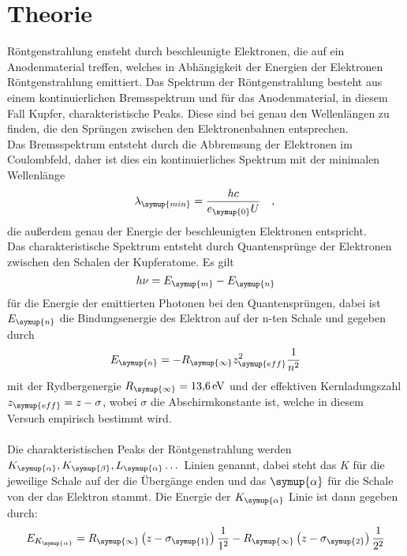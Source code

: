 \section{Theorie}
\label{sec:Theorie}
Röntgenstrahlung ensteht durch beschleunigte Elektronen, die auf ein Anodenmaterial
treffen, welches in Abhängigkeit der Energien der Elektronen Röntgenstrahlung
emittiert. Das Spektrum der Röntgenstrahlung besteht aus einem kontinuierlichen Bremsspektrum
und für das Anodenmaterial, in diesem Fall Kupfer, charakteristische Peaks.
Diese sind bei genau den Wellenlängen zu finden, die den Sprüngen zwischen den
Elektronenbahnen entsprechen.\\
Das Bremsspektrum entsteht durch die Abbremsung der Elektronen im Coulombfeld, daher ist
dies ein kontinuierliches Spektrum mit der minimalen Wellenlänge
\begin{equation}
  \lambda_\symup{min} = \dfrac{hc}{e_\symup{0}U} \quad,
  \label{eqn:lambda_min}\\
\end{equation}
die außerdem genau der Energie der beschleunigten Elektronen entspricht.\\
Das charakteristische Spektrum entsteht durch Quantensprünge der Elektronen zwischen
den Schalen der Kupferatome. Es gilt
\begin{equation}
  h \nu = E_\symup{m} - E_\symup{n}
  \label{eqn:hnu}\\
\end{equation}
für die Energie der emittierten Photonen bei den Quantensprüngen, dabei ist $E_\symup{n}$ die
Bindungsenergie des Elektron auf der n-ten Schale und gegeben durch
\begin{equation}
  E_\symup{n} = -R_\symup{\infty} z_\symup{eff}^2 \dfrac{1}{n^2}
  \label{eqn:E_n}\\
\end{equation}
mit der Rydbergenergie $R_\symup{\infty} = \SI{13.6}{\electronvolt}$ und der effektiven
Kernladungszahl $z_\symup{eff} = z - \sigma$, wobei $\sigma$ die Abschirmkonstante ist, welche
in diesem Versuch empirisch bestimmt wird.\\\\
Die charakteristischen Peaks der Röntgenstrahlung werden $K_\symup{\alpha},K_\symup{\beta},
L_\symup{\alpha}\dots$ Linien genannt, dabei steht das $K$ für die jeweilige Schale auf der die Übergänge
enden und das $\symup{\alpha}$ für die Schale von der das Elektron stammt. Die Energie
der $K_\symup{\alpha}$ Linie ist dann gegeben durch:
\begin{equation}
  E_{K_\symup{\alpha}} = R_\symup{\infty} \left(z - \sigma_\symup{1} \right)\dfrac{1}{1^2} -
  R_\symup{\infty}\left(z - \sigma_\symup{2}\right) \dfrac{1}{2^2}
  \label{eqn:E_K_a}\\
\end{equation}
